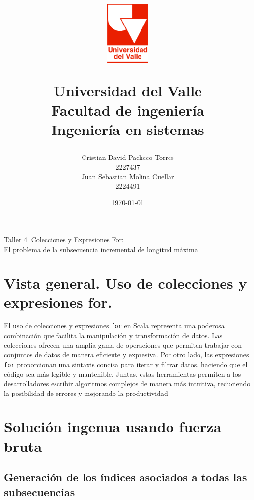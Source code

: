 \documentclass[12pt, a4paper]{article}
\title{
  \begin{figure}[th]
    \centering
    \includegraphics[width=0.2\textwidth]{Univalle}
  \end{figure}
  \textbf{Universidad del Valle
    \\{\Large Facultad de ingeniería}
  \\{\large Ingeniería en sistemas}}}
\author{Cristian David Pacheco Torres
  \\ 2227437
  \\ Juan Sebastian Molina Cuellar
  \\ 2224491}
\date{\today}
\begin{document}
\maketitle
{Taller 4: Colecciones y Expresiones For:
\\ El problema de la subsecuencia incremental de longitud máxima}
\newpage{}

\tableofcontents
\newpage{}
\section{Vista general. Uso de colecciones y expresiones for.}
El uso de colecciones y expresiones \texttt{for} en Scala representa una poderosa combinación que facilita la manipulación y transformación de datos. Las colecciones ofrecen una amplia gama de operaciones que permiten trabajar con conjuntos de datos de manera eficiente y expresiva. Por otro lado, las expresiones \texttt{for} proporcionan una sintaxis concisa para iterar y filtrar datos, haciendo que el código sea más legible y mantenible. Juntas, estas herramientas permiten a los desarrolladores escribir algoritmos complejos de manera más intuitiva, reduciendo la posibilidad de errores y mejorando la productividad.

\section{Solución ingenua usando fuerza bruta}
\subsection{Generación de los índices asociados a todas las subsecuencias}
\end{document}
